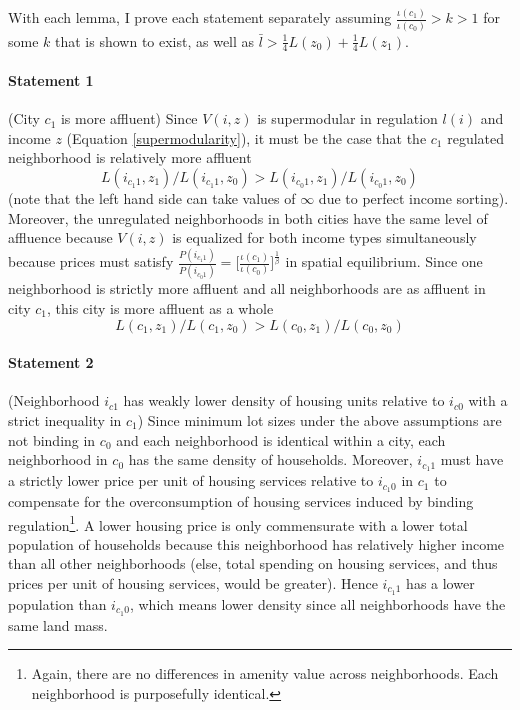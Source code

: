 \documentclass[11pt]{article}
\begin{document}
	With each lemma, I prove each statement separately assuming $\frac{\iota(c_{1})}{\iota(c_{0})} > k > 1$ for some $k$ that is shown to exist, as well as $\bar{l} > \frac{1}{4}L(z_{0}) + \frac{1}{4}L(z_{1})$.
	
	\paragraph*{Statement 1} (City $c_{1}$ is more affluent) Since $V(i, z)$ is supermodular in regulation $l(i)$ and income $z$ (Equation \ref{supermodularity}), it must be the case that the $c_{1}$ regulated neighborhood is relatively more affluent $$L(i_{c_{1}1}, z_{1})/L(i_{c_{1}1}, z_{0}) > L(i_{c_{0}1}, z_{1})/L(i_{c_{0}1}, z_{0})$$ (note that the left hand side can take values of $\infty$ due to perfect income sorting). Moreover, the unregulated neighborhoods in both cities have the same level of affluence because $V(i, z)$ is equalized for both income types simultaneously because prices  must satisfy $\frac{P(i_{c_{1}1})}{P(i_{c_{0}1})} = \bigg[\frac{\iota(c_{1})}{\iota(c_{0})}\bigg]^{\frac{1}{\beta}}$ in spatial equilibrium. Since one neighborhood is strictly more affluent and all neighborhoods are as affluent in city $c_{1}$, this city is more affluent as a whole $$L(c_{1}, z_{1})/L(c_{1}, z_{0}) > L(c_{0}, z_{1})/L(c_{0}, z_{0})$$
	 
	
	\paragraph*{Statement 2} (Neighborhood $i_{c1}$ has weakly lower density of housing units relative to $i_{c0}$ with a strict inequality in $c_{1}$) Since minimum lot sizes under the above assumptions are not binding in $c_{0}$ and each neighborhood is identical within a city, each neighborhood in $c_{0}$ has the same density of households. Moreover, $i_{c_{1}1}$ must have a strictly lower price per unit of housing services relative to $i_{c_{1}0}$ in $c_{1}$ to compensate for the overconsumption of housing services induced by binding regulation\footnote{Again, there are no differences in amenity value across neighborhoods. Each neighborhood is purposefully identical.}. A lower housing price is only commensurate with a lower total population of households because this neighborhood has relatively higher income than all other neighborhoods (else, total spending on housing services, and thus prices per unit of housing services, would be greater). Hence $i_{c_{1}1}$ has a lower population than $i_{c_{1}0}$, which means lower density since all neighborhoods have the same land mass.
	
\end{document}
